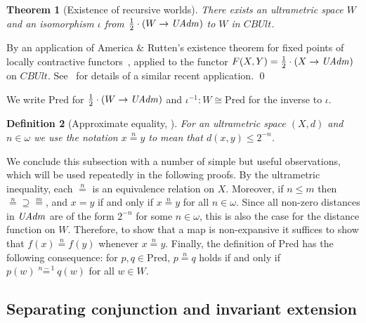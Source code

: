 \documentclass{LMCS}
\newtheorem{theorem}{Theorem}[section]
\newtheorem{definition}[theorem]{Definition}
\theoremstyle{remark}
\newcommand{\Pred}{\ensuremath{\mathrm{Pred}}\xspace}
\newcommand{\CBUlt}{\mathit{CBUlt}\xspace}
\newcommand{\W}{\ensuremath{W}}
\newcommand{\FOLD}{\ensuremath{\iota}}
\newcommand{\UNFOLD}{\ensuremath{\iota^{-1}}}
\newcommand{\nequiv}[1]{\ensuremath{\mathrel{\stackrel{#1}{=}}}}
\begin{document}
\begin{theorem}[Existence of recursive worlds]
\label{thm:ultrametric-existence}
There exists an ultrametric space $W$ and an isomorphism 
$\FOLD$ from $\frac 1 2\cdot(W\to\mathit{UAdm})$ to $W$
in $\CBUlt$. 
\end{theorem}
\proof
  By an application of America \& Rutten's existence theorem for fixed points of locally contractive 
  functors~\cite{America-Rutten:JCSS89}, applied to the functor $F(X,Y)= \frac 1 2\cdot(X\to\mathit{UAdm})$ on $\CBUlt$. 
  See~\cite{Birkedal:Stovring:Thamsborg:09} for details of a similar recent 
  application.  
\qed


We write $\Pred$ for $\frac 1 2\cdot(\W\to\UAdm)$ and $\UNFOLD: W\cong \Pred$ for the
inverse to $\FOLD$.


\begin{definition}[Approximate equality,  \cite{Birkedal:Stovring:Thamsborg:09}]
For an ultrametric space $(X,d)$ and $n\in\omega$ we use the notation $x \nequiv n y$ to mean that $d(x,y)\leq 2^{-n}$. 
\end{definition}

We conclude this subsection with a number of simple  but useful observations, which will be used repeatedly in the following proofs. 
By the ultrametric inequality, each $\nequiv n$ is an equivalence relation on $X$. 
Moreover, if $n\leq m$ then  ${\nequiv n} \supseteq {\nequiv m}$, and $x=y$ if and only if $x\nequiv n y$ for all $n\in\omega$. 
Since all non-zero distances in $\mathit{UAdm}$ are of the form $2^{-n}$ for some $n\in\omega$, this is also the case for the distance function on $\W$. 
Therefore, to show that a map is non-expansive it suffices to show that $f(x)\nequiv n f(y)$ whenever $x\nequiv n y$. 
Finally, the definition of $\Pred$ has  the following consequence:   
for $p,q\in\Pred$, $p\nequiv n q$ holds if and only if $p(w)\nequiv{n-1} q(w)$ for all $w\in\W$. 




\subsection{Separating conjunction and invariant extension}
\end{document}
